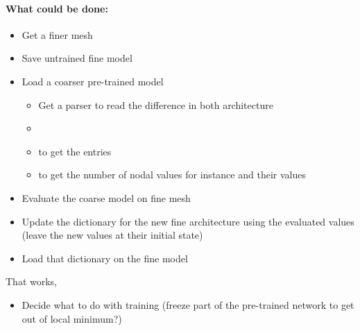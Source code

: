 \paragraph{What could be done:} 
\begin{itemize}
    \item Get a finer mesh
    \item Save untrained fine model
    \item Load a coarser pre-trained model
    \begin{itemize}
        \item Get a parser to read the difference in both architecture
        \item {}
        \item {} to get the entries 
        \item {} to get the number of nodal values for instance and their values
    \end{itemize}
    \item Evaluate the coarse model on fine mesh
    \item Update the  dictionary for the new fine architecture using the evaluated values (leave the new values at their initial state)
    \item Load that dictionary on the fine model
\end{itemize}


That works, 
\begin{itemize}
    \item Decide what to do with training (freeze part of the pre-trained network to get out of local minimum?)
\end{itemize}